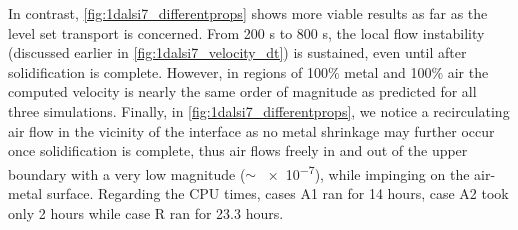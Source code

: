 In contrast, \cref{fig:1dalsi7_differentprops} shows more viable results as far as the level set transport is concerned.
From 200 s to 800 s, the local flow instability (discussed earlier in \cref{fig:1dalsi7_velocity_dt}) is sustained, even until after solidification is complete.
However, in regions of 100\% metal and 100\% air the computed velocity is nearly the same order of magnitude as predicted for all three simulations.
Finally, in \cref{fig:1dalsi7_differentprops}, we notice a recirculating air flow in the vicinity of the interface as no metal shrinkage 
may further occur once solidification is complete, thus air flows freely in and out 
of the upper boundary with a very low magnitude ($\sim$ \SI{e-7}{\uvelocity}), while impinging on the air-metal surface.
Regarding the CPU times, cases A1 ran for 14 hours, case A2 took only 2 hours while case R ran for 23.3 hours.
